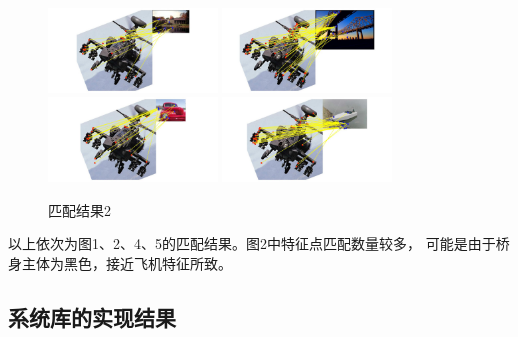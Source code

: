 \documentclass{article}
\begin{document}
\begin{figure}[h]
\centering
\includegraphics[width=0.4\textwidth]{./result/1}
\includegraphics[width=0.4\textwidth]{./result/2}
\includegraphics[width=0.4\textwidth]{./result/4}
\includegraphics[width=0.4\textwidth]{./result/5}
\caption{匹配结果2}
\end{figure}

    以上依次为图1、2、4、5的匹配结果。图2中特征点匹配数量较多，
    可能是由于桥身主体为黑色，接近飞机特征所致。

\subsection{系统库的实现结果}
\newpage
\end{document}
